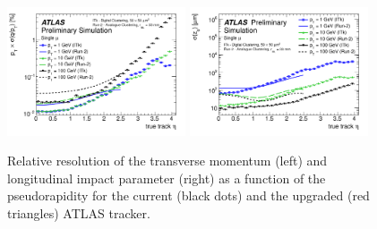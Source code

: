 \begin{figure}[h!tbp]
\begin{center}
  \includegraphics[width=0.47\textwidth]{figures/ch03_fig_006e.png}
  \includegraphics[width=0.47\textwidth]{figures/ch03_fig_006b.png}
  \caption{ Relative resolution of the transverse momentum (left) and longitudinal impact parameter (right) as a function of the pseudorapidity for the current (black dots) and the upgraded (red triangles) ATLAS tracker. 
 }
  \label{fig:atlastrackres}
\end{center}
\end{figure}





